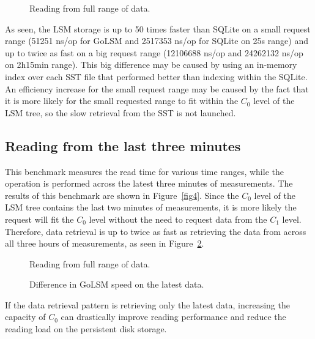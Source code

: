 \begin{figure}[h!]
\centering

\caption{Reading from full range of data.} \label{fig3}
\end{figure}

As seen, the LSM storage is up to 50 times faster than SQLite on a small request range (51251 ns/op for GoLSM and 2517353 ns/op for SQLite on 25s range) and up to twice as fast on a big request range (12106688 ns/op and 24262132 ns/op on 2h15min range). This big difference may be caused by using an in-memory index over each SST file that performed better than indexing within the SQLite. An efficiency increase for the small request range may be caused by the fact that it is more likely for the small requested range to fit within the $C_0$ level of the LSM tree, so the slow retrieval from the SST is not launched.

\subsection{Reading from the last three minutes}

This benchmark measures the read time for various time ranges, while the operation is performed across the latest three minutes of measurements. The results of this benchmark are shown in Figure~\ref{fig4}. Since the $C_0$ level of the LSM tree contains the last two minutes of measurements, it is more likely the request will fit the $C_0$ level without the need to request data from the $C_1$ level. Therefore, data retrieval is up to twice as fast as retrieving the data from across all three hours of measurements, as seen in Figure~\ref{fig5}. 

\begin{figure}[!htb]
   \begin{minipage}{0.48\textwidth}
    \centering
    \resizebox{\textwidth}{!}{%
        
    }
    \caption{Reading from full range of data.}\label{fig4}
   \end{minipage}\hfill
   \begin{minipage}{0.48\textwidth}
    \centering
    \resizebox{\textwidth}{!}{%
        
    }
     \caption{Difference in GoLSM speed on the latest data.}\label{fig5}
   \end{minipage}
\end{figure}

If the data retrieval pattern is retrieving only the latest data, increasing the capacity of $C_0$ can drastically improve reading performance and reduce the reading load on the persistent disk storage.

